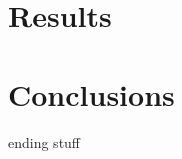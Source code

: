 \def\topfraction{.9}
\def\floatpagefraction{.8}

\section{Results}


\section{Conclusions}
ending stuff
